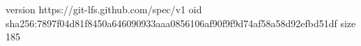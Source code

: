 version https://git-lfs.github.com/spec/v1
oid sha256:7897f04d81f8450a646090933aaa0856106af90f9f9d74af58a58d92efbd51df
size 185
